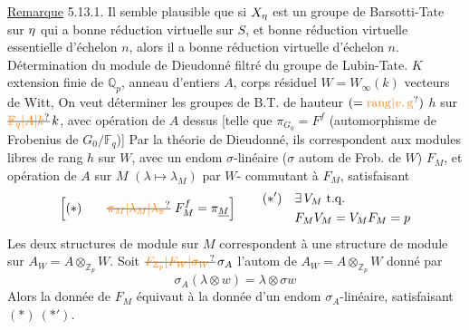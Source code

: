 \uline{Remarque} 5.13.1. Il semble plausible que si $X_{\eta}$ est un groupe de Barsotti-Tate sur $\eta$ qui a bonne réduction virtuelle sur $S$, et bonne réduction virtuelle essentielle d'échelon $n$, alors il a bonne réduction virtuelle d'échelon $n$. 
Détermination du module de Dieudonné filtré du groupe de Lubin-Tate.
$K$ extension finie de $\mathbb Q_p$, anneau d'entiers $A$, corps résiduel
$W=W_\infty(k)$ vecteurs de Witt,
On veut déterminer  les groupes de B.T.  de hauteur $(=\unsure{\mathrm{rang}|v.\,\mathrm{g}})$ $h$ sur $\deleted{\unsure{\mathbb F_q|A|k}}\,k$, avec opération de $A$ dessus [telle que $\pi_{G_0}=F^f$ (automorphisme de Frobenius de $G_0/\mathbb F_q$)]
Par la théorie de Dieudonné, ils correspondent aux modules libres  de rang $h$ sur $W$, avec un endom $\sigma$-linéaire ($\sigma$ autom de Frob. de $W$) $F_M$, et opération de $A$ sur $M$ $(\lambda\mapsto\lambda_M)$ par $W$- commutant à $F_M$, satisfaisant
\[
\left[(*)\qquad\deleted{\unsure{\pi_M|\lambda_M|\lambda_\pi}}\ F_M^f=\pi_{\underline M}\right]
\qquad
\begin{aligned}
(*')\quad&\exists\,V_M\ \text{t.q.}\\
&F_MV_M=V_MF_M=p
\end{aligned}
\]
Les deux structures de module sur $M$ correspondent à une structure de module sur $A_W=A\otimes_{\mathbb Z_p}W$. Soit $\deleted{\unsure{F_{\mathbb Z_p}|F_W|\sigma_W}}\,\sigma_A$ l'autom de $A_W=A\otimes_{\mathbb Z_p}W$ donné par
\[
\sigma_A(\lambda\otimes w)=\lambda\otimes\sigma w
\]
Alors la donnée de $F_M$ équivaut à la donnée d'un endom $\sigma_A$-linéaire, satisfaisant $(*)\ (*')$.
